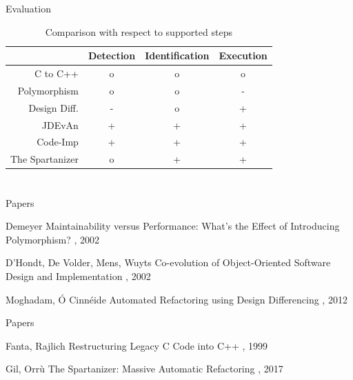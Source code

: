 \documentclass{beamer}
\begin{document}
\begin{frame}{Evaluation}
	\begin{table}[htb]
		\centering
		\caption{Comparison with respect to supported steps}
		\label{tbl:steps}
		\begin{tabular}{r|ccc}
			~               & Detection & Identification  & Execution \\ \hline
			C to C++        & o         & o               & o \\
			Polymorphism    & o         & o               & - \\
			Design Diff.    & -         & o               & + \\
			JDEvAn          & +         & +               & + \\
			Code-Imp        & +         & +               & + \\
			The Spartanizer & o         & +               & + \\
		\end{tabular}
	\end{table}
\end{frame}

\appendix
\section*{\appendixname}

\begin{frame}{Papers}
  \begin{thebibliography}{10}
    \beamertemplatearticlebibitems
    
      Demeyer
      \newblock Maintainability versus Performance: What's the Effect of Introducing Polymorphism?
      , 2002
    
      D'Hondt, De Volder, Mens, Wuyts
      \newblock Co-evolution of Object-Oriented Software Design and Implementation
      , 2002
    
      Moghadam, Ó Cinnéide
      \newblock Automated Refactoring using Design Differencing
      , 2012
  \end{thebibliography}
\end{frame}

\begin{frame}{Papers}
  \begin{thebibliography}{10}
    \beamertemplatearticlebibitems
    
      Fanta, Rajlich
      \newblock Restructuring Legacy C Code into C++
      , 1999
    
      Gil, Orrù
      \newblock The Spartanizer: Massive Automatic Refactoring
      , 2017
  \end{thebibliography}
\end{frame}
\end{document}
